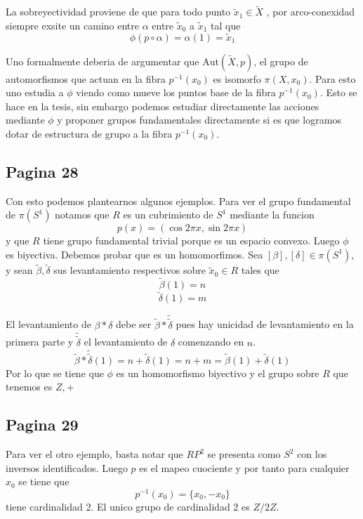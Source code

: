 \documentclass[letterpaper]{article}
\begin{document}
La sobreyectividad proviene de que para todo punto \(\tilde x_1 \in
\tilde X\) , por arco-conexidad siempre exsite un camino entre
\(\alpha\) entre \(\tilde x_0\) a \(\tilde x_1\) tal que
\[ \phi (p \circ \alpha) = \alpha (1) = \tilde x_1\]

Uno formalmente deberia de argumentar que \(\text{Aut} (\tilde X,p)\),
el grupo de automorfismos que actuan en la fibra \(p^{-1} (x_0)\) es
isomorfo \(\pi (X, x_0)\). Para esto uno estudia a \(\phi\) viendo como
mueve los puntos base de la fibra \(p^{-1} (x_0)\). Esto se hace en la
tesis, sin embargo podemos estudiar directamente las acciones mediante
\(\phi\) y proponer grupos fundamentales directamente si es que logramos
dotar de estructura de grupo a la fibra \(p^{-1} (x_0)\).

\subsection*{Pagina 28}
Con esto podemos plantearnos algunos ejemplos. Para ver el grupo
fundamental de \(\pi(S^1)\) notamos que \(R\) es un cubrimiento de \(S^1
\) mediante la funcion
\[ p (x) = (\cos 2 \pi x, \sin 2 \pi x) \]
y que \(R\) tiene grupo fundamental trivial porque es un espacio
convexo. Luego \(\phi\) es biyectiva. Debemos probar que es un
homomorfimos.
Sea \([\beta],[\delta] \in \pi (S^1)\), y sean \(\tilde
\beta , \tilde \delta\) sus levantamiento respectivos sobre \(\tilde x_0
\in R\) tales que
\[ \tilde \beta (1) = n \]
\[ \tilde \delta (1) = m \]

El levantamiento de \(\beta * \delta \) debe ser \(\tilde \beta
* \tilde {\tilde \delta}\) pues hay unicidad de levantamiento en la
primera parte y \(\tilde {\tilde \delta}\) el levantamiento de
\(\delta\) comenzando en \(n\).
\[ \tilde \beta * \tilde {\tilde \delta} (1) = n + \tilde \delta (1) =
  n + m = \tilde \beta (1) + \tilde \delta (1) \]
Por lo que se tiene que \(\phi \) es un homomorfismo biyectivo y el
grupo sobre \(R\) que tenemos es \(Z, +\)

\subsection*{Pagina 29}
Para ver el otro ejemplo, basta notar que \(RP^2\) se presenta como
\(S^2 \) con los inversos identificados. Luego \(p\) es el mapeo cuociente
y por tanto para cualquier \(x_0\) se tiene que
\[ p^{-1} (x_0) = \{x_0 , - x_0\}\]
tiene cardinalidad 2. El unico grupo de cardinalidad 2 es \(Z/2Z\).
\end{document}
